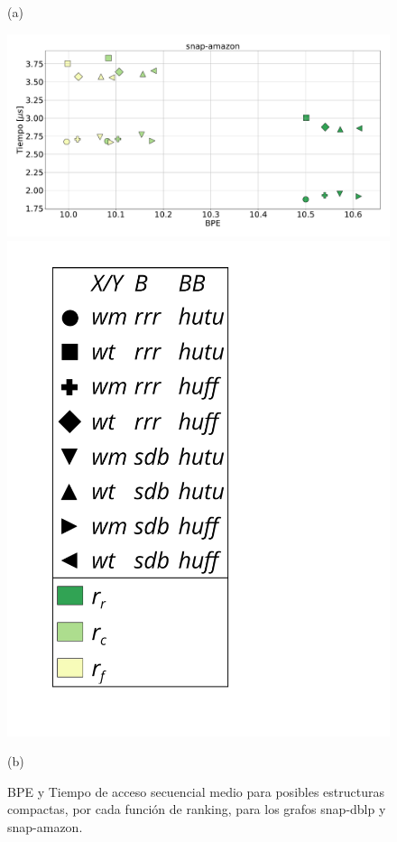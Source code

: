 \begin{figure}
\begin{minipage}{1\textwidth}
    			(a)		
    	\end{minipage}
    	
       	\begin{minipage}{1\textwidth}
    			\centering
    			\begin{minipage}{0.8\textwidth}
    				\centering
    				\includegraphics[width=1\linewidth]{img/sdsl/secuencialBig/snap-amazon.pdf}
    			\end{minipage}
    			\begin{minipage}{0.15\textwidth}
    				\centering
    				\includegraphics[scale=.235, clip, trim=70 0 0 0]{img/sdsl/label.pdf}
    			\end{minipage}
    			
    			(b)		
    	\end{minipage}
    	
    \caption{BPE y Tiempo de acceso secuencial medio para posibles estructuras compactas, por cada función de ranking, para los grafos snap-dblp y snap-amazon.}
    \label{fig:sdslBPE4}
\end{figure}
